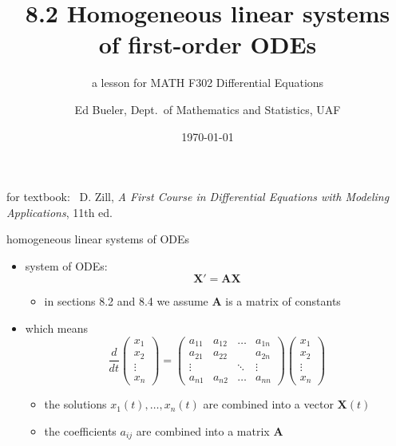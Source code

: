 \documentclass[urlcolor=blue,dvipsnames]{beamer}
\title{8.2 Homogeneous linear systems \\ of first-order ODEs}
\subtitle{a lesson for MATH F302 Differential Equations}
\author{Ed Bueler, Dept.~of Mathematics and Statistics, UAF}
\date{\tiny \today}
\newcommand{\bA}{\mathbf{A}}
\newcommand{\bX}{\mathbf{X}}
\begin{document}
\renewcommand{\thefootnote}{{\color{green} \arabic{footnote}}}

\begin{frame}
\titlepage

\centerline{\tiny for textbook: \, D. Zill, \emph{A First Course in Differential Equations with Modeling Applications}, 11th ed.}
\end{frame}


\begin{frame}{homogeneous linear systems of ODEs}

\begin{itemize}
\item system of ODEs:
    $$\bX' = \bA \bX$$
    \begin{itemize}
    \item in sections 8.2 and 8.4 we assume $\bA$ is a matrix of constants
    \end{itemize}
\item which means
    $$\frac{d}{dt} \begin{pmatrix} x_1 \\ x_2 \\ \vdots \\ x_n \end{pmatrix} = \begin{pmatrix}
a_{11} & a_{12} & \dots & a_{1n} \\
a_{21} & a_{22} &       & a_{2n} \\
 \vdots&        & \ddots& \vdots \\
a_{n1} & a_{n2} & \dots & a_{nn}
\end{pmatrix}     \begin{pmatrix} x_1 \\ x_2 \\ \vdots \\ x_n \end{pmatrix}$$
    \begin{itemize}
    \item the solutions $x_1(t),\dots,x_n(t)$ are combined into a vector $\bX(t)$
    \item the coefficients $a_{ij}$ are combined into a matrix $\bA$
    \end{itemize}
\end{itemize}
\end{frame}
\end{document}

